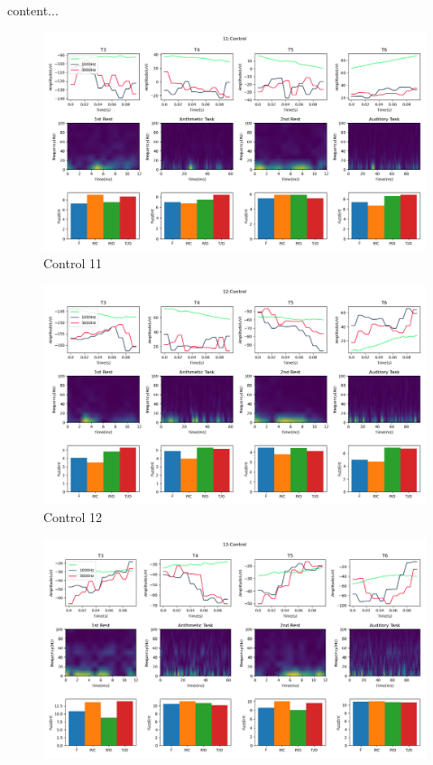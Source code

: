 \documentclass[10pt]{article}
\begin{document}
\begin{landscape}
	content...

\begin{figure}
  \includegraphics[width=7.2in]{figures/11.png}
  \caption{Control 11}
  \label{fig:control_11}
\end{figure}
\clearpage
\begin{figure}
  \includegraphics[width=7.2in]{figures/12.png}
  \caption{Control 12}
  \label{fig:control_12}
\end{figure}
\clearpage
\begin{figure}
  \includegraphics[width=7.2in]{figures/13.png}

\end{figure}
\end{landscape}
\end{document}
